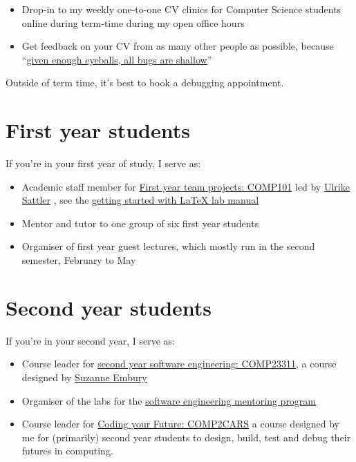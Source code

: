 \documentclass[
  12pt,
]{book}
\providecommand{\tightlist}{%
  \setlength{\itemsep}{0pt}\setlength{\parskip}{0pt}}
\begin{document}
\begin{itemize}
\tightlist
\item
  Drop-in to my weekly one-to-one CV clinics for Computer Science students online during term-time during my open office hours
\item
  Get feedback on your CV from as many other people as possible, because ``\href{https://en.wikipedia.org/wiki/Linus\%27s_law}{given enough eyeballs, all bugs are shallow}'' \citep{Raymond1999}
\end{itemize}

Outside of term time, it's best to book a debugging appointment. 🐛

\hypertarget{year1}{%
\section{First year students}\label{year1}}

If you're in your first year of study, I serve as:

\begin{itemize}
\tightlist
\item
  Academic staff member for \href{https://studentnet.cs.manchester.ac.uk/ugt/COMP10120/syllabus/}{First year team projects: COMP101} led by \href{http://www.cs.man.ac.uk/~sattler/}{Ulrike Sattler} \citep{COMP10120}, see the \href{http://latex4year1.netlify.app}{getting started with LaTeX lab manual}
\item
  Mentor and tutor to one group of six first year students
\item
  Organiser of first year guest lectures, which mostly run in the second semester, February to May
\end{itemize}

\hypertarget{year2}{%
\section{Second year students}\label{year2}}

If you're in your second year, I serve as:

\begin{itemize}
\tightlist
\item
  Course leader for \href{https://studentnet.cs.manchester.ac.uk/ugt/COMP23311/syllabus/}{second year software engineering: COMP23311}, a course designed by \href{http://www.cs.man.ac.uk/~embury/}{Suzanne Embury} \citep{COMP23311, git}
\item
  Organiser of the labs for the \href{https://www.cs.manchester.ac.uk/connect/business-engagement/industrial-mentoring/}{software engineering mentoring program}
\item
  Course leader for \href{https://www.cdyf.me/}{Coding your Future: COMP2CARS} a course designed by me for (primarily) second year students to design, build, test and debug their futures in computing.
\end{itemize}
\end{document}
